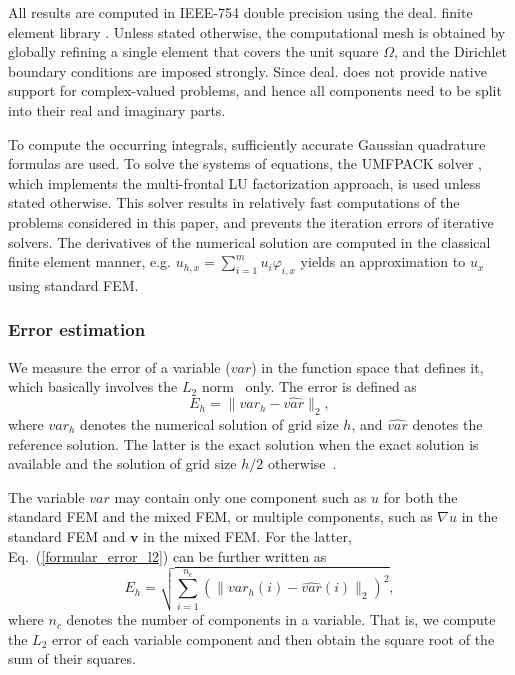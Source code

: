 \documentclass[review,3p]{elsarticle}
\begin{document}
All results are computed in IEEE-754 double precision \cite{zuras2008ieee} using the deal. finite element library \cite{bangerth2007deal}. Unless stated otherwise, the computational mesh is obtained by globally refining a single element that covers the unit square $\Omega$, and the Dirichlet boundary conditions are imposed strongly. Since deal. does not provide native support for complex-valued problems, and hence all components need to be split into their real and imaginary parts.

To compute the occurring integrals, sufficiently accurate Gaussian quadrature formulas are used. 
To solve the systems of equations, the UMFPACK solver \cite{davis2004algorithm}, which implements the multi-frontal LU factorization approach, is used unless stated otherwise. This solver results in relatively fast computations of the problems considered in this paper, and prevents the iteration errors of iterative solvers. The derivatives of the numerical solution are computed in the classical finite element manner, e.g. $u_{h,x}=\sum\limits _{i=1}^m u_i\varphi_{i,x}$ yields an approximation to $u_x$ using standard FEM.
\subsubsection{Error estimation}

We measure the error of a variable ($var$) in the function space that defines it, which basically involves the $L_2$ norm~\cite{ref1} only. The error is defined as
\begin{equation}
 E_{h} = {\|var_{h}- \hat{var} \|_{2}},			\label{formular_error_l2}
\end{equation}
where $var_h$ denotes the numerical solution of grid size $h$, and $\hat{var}$ denotes the reference solution.
The latter is the exact solution when the exact solution is available and the solution of grid size $h/2$ otherwise~\cite{Runborg2012VerifyingNC}.

The variable $var$ may contain only one component such as $u$ for both the standard FEM and the mixed FEM, or multiple components, such as $\nabla u$ in the standard FEM and $\mathbf{v}$ in the mixed FEM. For the latter, Eq.~(\ref{formular_error_l2}) can be further written as~\cite{bangerth2007deal,boffi2013mixed}
\begin{equation}
 E_{h} = \sqrt{\sum _{i=1} ^{n_c} (\|var_{h}(i)- \hat{var}(i)\|_{2})^2},			\label{formular_error_l2_vector}
\end{equation}
where $n_c$ denotes the number of components in a variable.
That is, we compute the $L_2$ error of each variable component and then obtain the square root of the sum of their squares.
\end{document}
